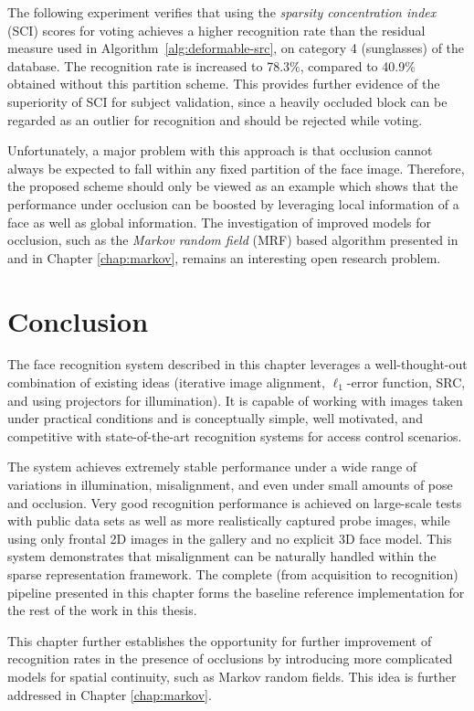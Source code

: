 The following experiment verifies that using the \emph{sparsity
concentration index} (SCI) scores for voting achieves a higher recognition rate
than the residual measure used in Algorithm~\ref{alg:deformable-src}, on
category 4 (sunglasses) of the database. The recognition rate is increased to
78.3\%, compared to 40.9\% obtained without this partition scheme. This provides
further evidence of the superiority of SCI for subject validation, since a
heavily occluded block can be regarded as an outlier for recognition and should
be rejected while voting.

Unfortunately, a major problem with this
approach is that occlusion cannot always be expected to fall within
 any fixed partition of the face image. Therefore, the
proposed scheme should only be viewed as an example which shows
that the performance under occlusion can be boosted by
leveraging local information of a face as well as global information. 
The investigation of improved models for occlusion, such as the {\em Markov random field} (MRF)
based algorithm presented in \cite{ZhouZ2009} and in Chapter \ref{chap:markov},
remains an interesting open research problem.

\section{Conclusion}\label{sec:conclusion}
The face recognition system described in this chapter leverages a
well-thought-out combination of existing ideas (iterative image alignment,
$\ell_1$-error function, SRC, and using projectors for illumination).  It is
capable of working with images taken under practical conditions and is
conceptually simple, well motivated, and competitive with state-of-the-art
recognition systems for access control scenarios.

The system achieves extremely stable performance under a wide range of
variations in illumination, misalignment, and even under small amounts of pose
and occlusion. Very good recognition performance is achieved on large-scale
tests with public data sets as well as more realistically captured probe images,
while using only frontal 2D images in the gallery and no explicit 3D face
model.  This system demonstrates that misalignment can be naturally handled
within the sparse representation framework.  The complete (from acquisition to
recognition) pipeline presented in this chapter forms the baseline reference
implementation for the rest of the work in this thesis.

This chapter further establishes the opportunity for further improvement of
recognition rates in the presence of occlusions by introducing more complicated
models for spatial continuity, such as Markov random fields.  This idea is
further addressed in Chapter \ref{chap:markov}.

